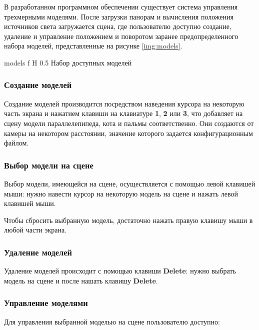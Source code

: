 В разработанном программном обеспечении существует система управления трехмерными моделями. После загрузки панорам и вычисления положения источников света загружается сцена, где пользователю доступно создание, удаление и управление положением и поворотом заранее предопределенного набора моделей, представленные на рисунке \ref{img:models}. 

{models}
{f}
{H}
{0.5\textwidth}
{Набор доступных моделей}

\subsubsection*{Создание моделей}

Создание моделей производится посредством наведения курсора на некоторую часть экрана и нажатием клавиши на клавиатуре \textbf{1}, \textbf{2} или \textbf{3}, что добавляет на сцену модели параллелепипеда, кота и пальмы соответственно. Они создаются от камеры на некотором расстоянии, значение которого задается конфигурационным файлом.

\subsubsection*{Выбор модели на сцене}

Выбор модели, имеющейся на сцене, осуществляется с помощью левой клавишей мыши: нужно навести курсор на некоторую модель на сцене и нажать левой клавишей мыши. 

Чтобы сбросить выбранную модель, достаточно нажать правую клавишу мыши в любой части экрана.

\subsubsection*{Удаление моделей}

Удаление моделей происходит с помощью клавиши \textbf{Delete}: нужно выбрать модель на сцене и после нашать клавишу \textbf{Delete}.

\subsubsection*{Управление моделями}

Для управления выбранной моделью на сцене пользователю доступно:

